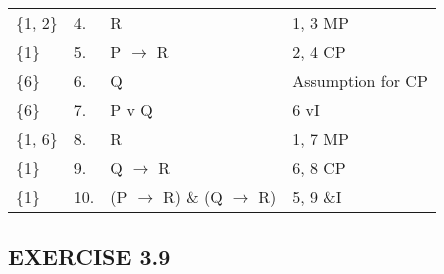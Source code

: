 \documentclass[a4paper,12pt]{article}
\newcommand{\ra}{$\rightarrow$ }
\begin{document}
\begin{enumerate}[label=\arabic*,leftmargin=*]
\begin{enumerate}[label=\arabic*.]
\begin{minipage}{\textwidth}
\begin{tabular}{l l l l}
                        \{1, 2\} & 4. & R & 1, 3 MP\\
                        \{1\} & 5. & P \ra R & 2, 4 CP\\
                        \{6\} & 6. & Q & Assumption for CP\\
                        \{6\} & 7. & P v Q & 6 vI\\
                        \{1, 6\} & 8. & R & 1, 7 MP\\
                        \{1\} & 9. & Q \ra R & 6, 8 CP\\
                        \{1\} & 10. & (P \ra R) \& (Q \ra R) & 5, 9 \&I\\
                    \end{tabular}
                \end{minipage}

        \end{enumerate}
    \end{enumerate}

    \subsection*{EXERCISE 3.9}
\end{document}
